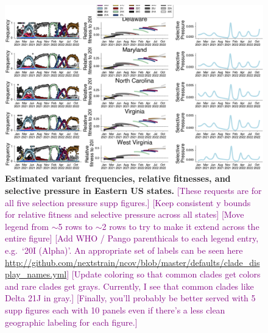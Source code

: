 \documentclass[11pt,oneside,letterpaper]{article}
\def\tbc#1{\textcolor{purple}{[#1]}}
\begin{document}
\begin{figure}[t!]
    \centering
    \includegraphics[width=1.0\textwidth=0.01]{./supplementary_figures/selective-pressure-analysis_East.png}
    \caption{
      \textbf{Estimated variant frequencies, relative fitnesses, and selective pressure in Eastern US states.}
      \tbc{These requests are for all five selection pressure supp figures.}
      \tbc{Keep consistent y bounds for relative fitness and selective pressure across all states}
      \tbc{Move legend from $\sim$5 rows to $\sim$2 rows to try to make it extend across the entire figure}
      \tbc{Add WHO / Pango parenthicals to each legend entry, e.g.\ `20I (Alpha)'. An appropriate set of labels can be seen here \url{http://github.com/nextstrain/ncov/blob/master/defaults/clade_display_names.yml}}
      \tbc{Update coloring so that common clades get colors and rare clades get grays. Currently, I see that common clades like Delta 21J in gray.}
      \tbc{Finally, you'll probably be better served with 5 supp figures each with 10 panels even if there's a less clean geographic labeling for each figure.}
    }
    \label{fig:selective_pressure_east}
\end{figure}
\end{document}
